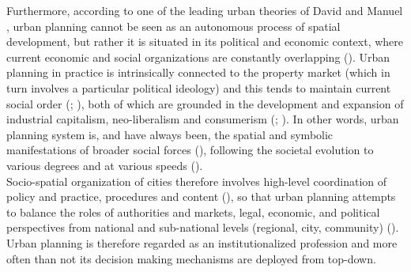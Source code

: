 \documentclass[11pt]{report}
\begin{document}
Furthermore, according to one of the leading urban theories of David \href{Harvey} \cite{Harvey???} and Manuel \href{Castells} \cite{Castells XXX}, urban planning cannot be seen as an autonomous process of spatial development, but rather it is situated in its political and economic context, where current economic and social organizations are constantly overlapping (\href{Taylor}{\citealt{Taylor_Urban_2006}}).
Urban planning in practice is intrinsically connected to the property market (which in turn involves a particular political ideology) and this tends to maintain current social order (\href{Drear}{\citealt{(Dear_Urbanization_1981}}; \href{Taylor}{\citealt{Taylor_Urban_2006}}), both of which are grounded in the development and expansion of industrial capitalism, neo-liberalism and consumerism (\href{Ellin}{\citealt{Ellin_Postmodern_1999}}; \href{Harvey}{\citealt{Harvey_Urban_1989}}).
In other words, urban planning system is, and have always been, the spatial and symbolic manifestations of broader social forces (\href{Giddens}{\citealt{Giddens_consequences_1992}}), following the societal evolution to various degrees and at various speeds (\href{Flyvbjerg}{\cite{Flyvbjerg, 1998}}).
\\

Socio-spatial organization of cities therefore involves high-level coordination of policy and practice, procedures and content (\href{Van}{\cite{(Van Assche and Verschraegen, 2008}}), so that urban planning attempts to balance the roles of authorities and markets, legal, economic, and political perspectives from national and sub-national levels (regional, city, community) (\href{Nedovic}{\citealt{Nedovic-Budic_Mornings_2011}}).
Urban planning is therefore regarded as an institutionalized profession and more often than not its decision making mechanisms are deployed from top-down.
\\
\end{document}
